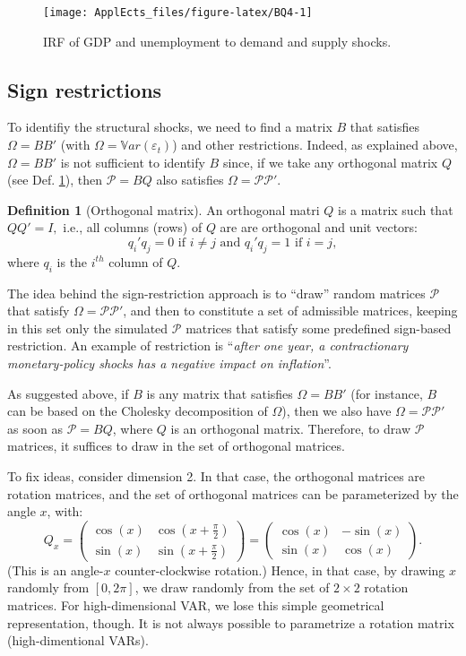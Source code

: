 \documentclass[
  12pt,
]{book}
\theoremstyle{definition}
\newtheorem{definition}{Definition}[chapter]
\theoremstyle{definition}
\theoremstyle{definition}
\theoremstyle{definition}
\theoremstyle{remark}
\begin{document}
\begin{figure}
\texttt{[image: ApplEcts\_files/figure-latex/BQ4-1]} \caption{IRF of GDP and unemployment to demand and supply shocks.}\label{fig:BQ4}
\end{figure}

\hypertarget{Signs}{%
\subsection{Sign restrictions}\label{Signs}}

To identifiy the structural shocks, we need to find a matrix \(B\) that satisfies \(\Omega = BB'\) (with \(\Omega = \mathbb{V}ar(\varepsilon_t)\)) and other restrictions. Indeed, as explained above, \(\Omega = BB'\) is not sufficient to identify \(B\) since, if we take any orthogonal matrix \(Q\) (see Def. \ref{def:orthogonal}), then \(\mathcal{P}=BQ\) also satisfies \(\Omega = \mathcal{P}\mathcal{P}'\).

\begin{definition}[Orthogonal matrix]
\protect\hypertarget{def:orthogonal}{}\label{def:orthogonal}An orthogonal matri \(Q\) is a matrix such that \(QQ' = I,\) i.e., all columns (rows) of \(Q\) are are
orthogonal and unit vectors:
\[q_i'q_j=0\text{ if }i\neq j\text{ and }q_i'q_j=1\text{ if }i= j,\]
where \(q_i\) is the \(i^{th}\) column of \(Q\).
\end{definition}

The idea behind the sign-restriction approach is to ``draw'' random matrices \(\mathcal{P}\) that satisfy \(\Omega = \mathcal{P}\mathcal{P}'\), and then to constitute a set of admissible matrices, keeping in this set only the simulated \(\mathcal{P}\) matrices that satisfy some predefined sign-based restriction. An example of restriction is ``\emph{after one year, a contractionary monetary-policy shocks has a negative impact on inflation}''.

As suggested above, if \(B\) is any matrix that satisfies \(\Omega = BB'\) (for instance, \(B\) can be based on the Cholesky decomposition of \(\Omega\)), then we also have \(\Omega = \mathcal{P}\mathcal{P}'\) as soon as \(\mathcal{P}=BQ\), where \(Q\) is an orthogonal matrix. Therefore, to draw \(\mathcal{P}\) matrices, it suffices to draw in the set of orthogonal matrices.

To fix ideas, consider dimension 2. In that case, the orthogonal matrices are rotation matrices, and the set of orthogonal matrices can be parameterized by the angle \(x\), with:
\[
Q_x=\begin{pmatrix}\cos(x)&\cos\left(x+\frac{\pi}{2}\right)\\
\sin(x)&\sin\left(x+\frac{\pi}{2}\right)\end{pmatrix}=\begin{pmatrix}\cos(x)&-\sin(x)\\
\sin(x)&\cos(x)\end{pmatrix}.
\]
(This is an angle-\(x\) counter-clockwise rotation.) Hence, in that case, by drawing \(x\) randomly from \([0,2\pi]\), we draw randomly from the set of \(2\times2\) rotation matrices. For high-dimensional VAR, we lose this simple geometrical representation, though. It is not always possible to parametrize a rotation matrix (high-dimentional VARs).
\end{document}
